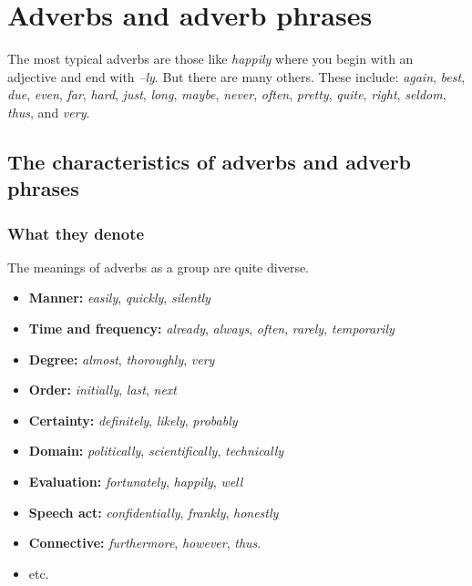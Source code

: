 \section{Adverbs and adverb phrases}
The most typical adverbs are those like \textit{happily} where you begin with an adjective and end with \textit{--ly}. But there are many others. These include: \textit{again}, \textit{best}, \textit{due}, \textit{even}, \textit{far}, \textit{hard}, \textit{just}, \textit{long}, \textit{maybe}, \textit{never}, \textit{often}, \textit{pretty}, \textit{quite}, \textit{right}, \textit{seldom}, \textit{thus}, and \textit{very}.

\subsection{The characteristics of adverbs and adverb phrases}

\subsubsection*{What they denote}

The meanings of adverbs as a group are quite diverse.

\begin{itemize}
   \item \textbf{Manner:} \textit{easily}, \textit{quickly}, \textit{silently}
   \item \textbf{Time and frequency:} \textit{already}, \textit{always}, \textit{often}, \textit{rarely}, \textit{temporarily}
   \item \textbf{Degree:} \textit{almost}, \textit{thoroughly}, \textit{very}
   \item \textbf{Order:} \textit{initially}, \textit{last}, \textit{next}
   \item \textbf{Certainty:} \textit{definitely}, \textit{likely}, \textit{probably}
   \item \textbf{Domain:} \textit{politically}, \textit{scientifically}, \textit{technically}
   \item \textbf{Evaluation:} \textit{fortunately}, \textit{happily}, \textit{well}
   \item \textbf{Speech act:} \textit{confidentially}, \textit{frankly}, \textit{honestly}
   \item \textbf{Connective:} \textit{furthermore}, \textit{however}, \textit{thus}.
   \item etc.
\end{itemize}

